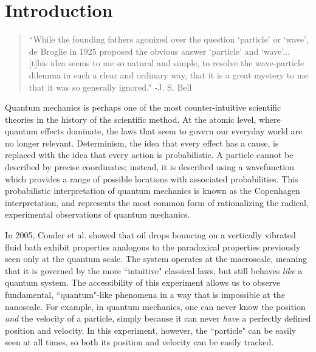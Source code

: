 		
\chapter*{Introduction}
\begin{quote}
	    ``While the founding fathers agonized over the question `particle' or `wave', de Broglie in 1925 proposed the obvious answer `particle' and `wave'... [t]his idea seems to me so natural and simple, to resolve the wave-particle dilemma in such a clear and ordinary way, that it is a great mystery to me that it was so generally ignored." -J. S. Bell
	    \end{quote}
	    

	    


Quantum mechanics is perhaps one of the most counter-intuitive scientific theories in the history of the scientific method. At the atomic level, where quantum effects dominate, the laws that seem to govern our everyday world are no longer relevant. Determinism, the idea that every effect has a cause, is replaced with the idea that every action is probabilistic. A particle cannot be described by precise coordinates; instead, it is described using a wavefunction which provides a range of possible locations with associated probabilities. This probabilistic interpretation of quantum mechanics is known as the Copenhagen interpretation, and represents the most common form of rationalizing the radical, experimental observations of quantum mechanics. 

In 2005, Couder et al. showed that oil drops bouncing on a vertically vibrated fluid bath exhibit properties analogous to the paradoxical properties previously seen only at the quantum scale.  The system operates at the macroscale, meaning that it is governed by the more ``intuitive" classical laws, but still behaves \textit{like} a quantum system. The accessibility of this experiment allows us to observe fundamental, ``quantum"-like phenomena in a way that is impossible at the nanoscale. For example, in quantum mechanics, one can never know the position \textit{and} the velocity of a particle, simply because it can never \textit{have} a perfectly defined position and velocity. In this experiment, however, the ``particle" can be easily seen at all times, so both its position and velocity can be easily tracked. 

